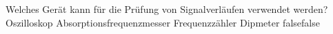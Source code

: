     {Welches Gerät kann für die Prüfung von Signalverläufen verwendet werden?}
    {Oszilloskop}
    {Absorptionsfrequenzmesser}
    {Frequenzzähler}
    {Dipmeter}
    {false}{false}